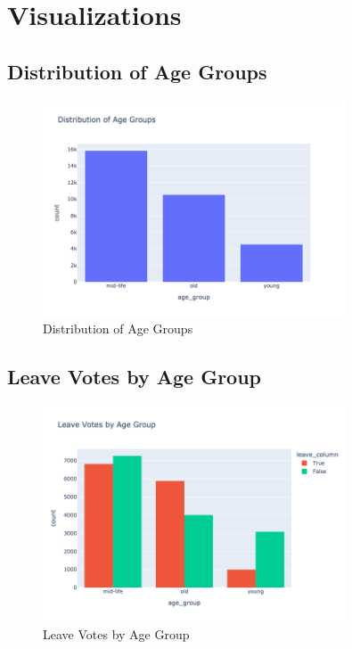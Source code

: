 \documentclass{article}
\begin{document}
\section*{Visualizations}

\subsection*{Distribution of Age Groups}
\begin{figure}[H] %
    \centering
    \includegraphics[width=0.8\textwidth]{age_group_distribution.png}
    \caption{Distribution of Age Groups}
\end{figure}

\subsection*{Leave Votes by Age Group}
\begin{figure}[H]
    \centering
    \includegraphics[width=0.8\textwidth]{leave_votes_by_age_group.png}
    \caption{Leave Votes by Age Group}
\end{figure}
\end{document}

